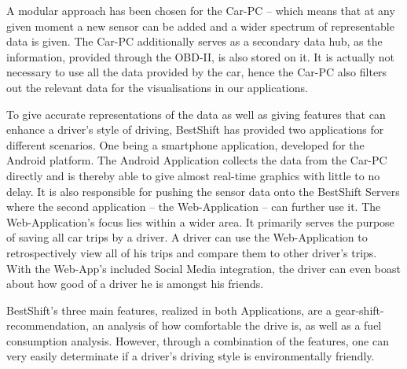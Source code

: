A modular approach has been chosen for the Car-PC – which means that at any given moment a new sensor can be added and a wider spectrum of representable data is given. The Car-PC additionally serves as a secondary data hub, as the information, provided through the OBD-II, is also stored on it. It is actually not necessary to use all the data provided by the car, hence the Car-PC also filters out the relevant data for the visualisations in our applications.

To give accurate representations of the data as well as giving features that can enhance a driver’s style of driving, BestShift has provided two applications for different scenarios. One being a smartphone application, developed for the Android platform. The Android Application collects the data from the Car-PC directly and is thereby able to give almost real-time graphics with little to no delay. It is also responsible for pushing the sensor data onto the BestShift Servers where the second application – the Web-Application – can further use it. The Web-Application’s focus lies within a wider area. It primarily serves the purpose of saving all car trips by a driver. A driver can use the Web-Application to retrospectively view all of his trips and compare them to other driver’s trips. With the Web-App’s included Social Media integration, the driver can even boast about how good of a driver he is amongst his friends.

BestShift’s three main features, realized in both Applications, are a gear-shift-recommendation, an analysis of how comfortable the drive is, as well as a fuel consumption analysis. However, through a combination of the features, one can very easily determinate if a driver’s driving style is environmentally friendly.